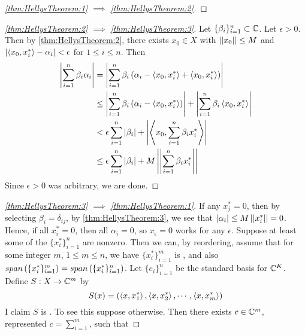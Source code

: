 \begin{thm}
\begin{proof}[\ref{thm:HellysTheorem:1} $\implies$ \ref{thm:HellysTheorem:2}]
    \end{proof}
    \begin{proof}[\ref{thm:HellysTheorem:2} $\implies$ \ref{thm:HellysTheorem:3}]
        Let $\{\beta_i\}_{i=1}^n \subset \mathbb{C}$.
        Let $\epsilon > 0$. 
        Then by \ref{thm:HellysTheorem:2}, there exists 
        $x_{0} \in X$ with $\left|\left| x_0 \right|\right| \leq M$ and 
        $\left| \left\langle x_0, x_i^* \right\rangle -\alpha_i \right| < \epsilon$ for $1 \leq i \leq n$. 
        Then
        \begin{align*}
        \left| \sum\limits_{i=1}^n \beta_i \alpha_i \right| 
        & = \left| \sum\limits_{i=1}^n \beta_i \left( \alpha_i - \left\langle x_0, x_i^* \right\rangle+\left\langle x_0, x_i^* \right\rangle\right) \right|\\
        & \leq \left| \sum\limits_{i=1}^n \beta_i \left( \alpha_i - \left\langle x_0, x_i^* \right\rangle\right) \right|
        + \left| \sum\limits_{i=1}^n  \beta_i \left\langle x_0, x_i^* \right\rangle \right|\\
        & < \epsilon \sum\limits_{i=1}^n \left| \beta_i \right| 
        + \left|  \left\langle x_0, \sum\limits_{i=1}^n \beta_ix_i^* \right\rangle \right|\\
        & \leq \epsilon \sum\limits_{i=1}^n \left| \beta_i \right| 
        + M \left|\left| \sum\limits_{i=1}^n \beta_i x_i^* \right|\right|
        \end{align*}
        Since $\epsilon > 0$ was arbitrary, we are done.
    \end{proof} 
    \begin{proof}[\ref{thm:HellysTheorem:3} $\implies$ \ref{thm:HellysTheorem:1}]
        If any $x_j^*=0$, then by selecting $\beta_i= \delta_{ij}$, 
        by \ref{thm:HellysTheorem:3}, we see that $\left| \alpha_i \right| \leq M \left|\left| x_i^* \right|\right| =0$. 
        Hence, if all $x_i^*=0$, 
        then all $\alpha_i = 0$, so 
        $x_\epsilon = 0$ works for any $\epsilon$. 
        Suppose at least some of the $\{x_i^*\}_{i=1}^n$ are nonzero.
        Then we can, by reordering, assume that for some integer $m$, 
        $1 \leq m \leq n$, we have 
        $\{x_i^*\}_{i=1}^m$ is
        \LinearlyIndependent,
        and also 
        $span \left( \{x_i^*\}_{i=1}^m\right)= span \left( \{x_i^*\}_{i=1}^n\right)$.
        Let $\{e_i\}_{i=1}^n$ be the standard basis for $\mathbb{C}^K$. 
        Define $S:X \to \mathbb{C}^m$ by 
        \begin{equation*}
        S(x) = \left( \left\langle x, x_1^* \right\rangle, \left\langle x, x_2^* \right\rangle, \cdots, \left\langle x, x_m^* \right\rangle\right)
        \end{equation*}
        I claim $S$ is \Surjective. 
        To see this suppose otherwise. 
        Then there exists $c \in \mathbb{C}^m$, represented $c=\sum_{i=1}^m$, such that 

\end{proof}
\end{thm}
